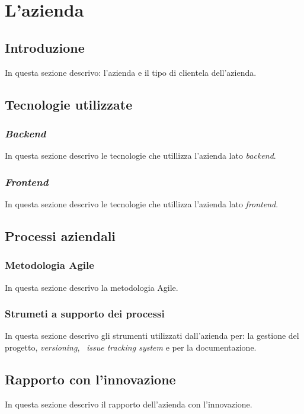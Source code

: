 
\chapter{L'azienda}
\label{cap:azienda}
\section{Introduzione}
In questa sezione descrivo: l'azienda e il tipo di clientela dell'azienda.

\section{Tecnologie utilizzate}

\subsection{\emph{Backend}}
In questa sezione descrivo le tecnologie che utillizza l'azienda lato \emph{backend}.

\subsection{\emph{Frontend}}
In questa sezione descrivo le tecnologie che utillizza l'azienda lato \emph{frontend}.

\section{Processi aziendali}

\subsection{Metodologia Agile}
In questa sezione descrivo la metodologia Agile.

\subsection{Strumeti a supporto dei processi}
In questa sezione descrivo gli strumenti utilizzati dall'azienda per: la gestione del progetto, \emph{versioning}, \
\emph{issue tracking system} e per la documentazione.

\section{Rapporto con l'innovazione}
In questa sezione descrivo il rapporto dell'azienda con l'innovazione.
